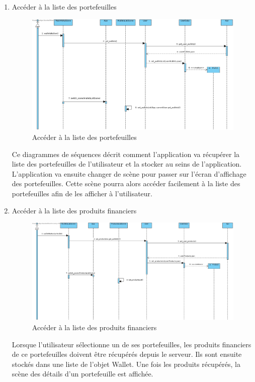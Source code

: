 \documentclass[../rapport.tex]{subfiles}
\begin{document}
\begin{enumerate}
	\item{Accéder à la liste des portefeuilles}\\
			\begin{figure}[h]
				\centering\includegraphics[scale=0.25]{ressources/photos_diagrammes/app1/sequences/accederPortefeuilles.jpg}
				\caption{Accéder à la liste des portefeuilles}
			\end{figure}	
Ce diagrammes de séquences décrit comment l'application va récupérer la liste des portefeuilles de l'utilisateur et la stocker au seins de l'application.
L'application va ensuite changer de scène pour passer sur l'écran d'affichage des portefeuilles. Cette scène pourra alors accéder facilement à la liste des portefeuilles afin de les afficher à l'utilisateur.
\newpage	
\item{Accéder à la liste des produits financiers}\\
			\begin{figure}[h]
				\centering\includegraphics[scale=0.25]{ressources/photos_diagrammes/app1/sequences/accederProduits.jpg}
				\caption{Accéder à la liste des produits financiers}
			\end{figure}	
Lorsque l'utilisateur sélectionne un de ses portefeuilles, les produits financiers de ce portefeuilles doivent être récupérés depuis le serveur. Ils sont ensuite stockés dans une liste de l'objet Wallet. Une fois les produits récupérés, la scène des détails d'un portefeuille est affichée.

\end{enumerate}
\end{document}

